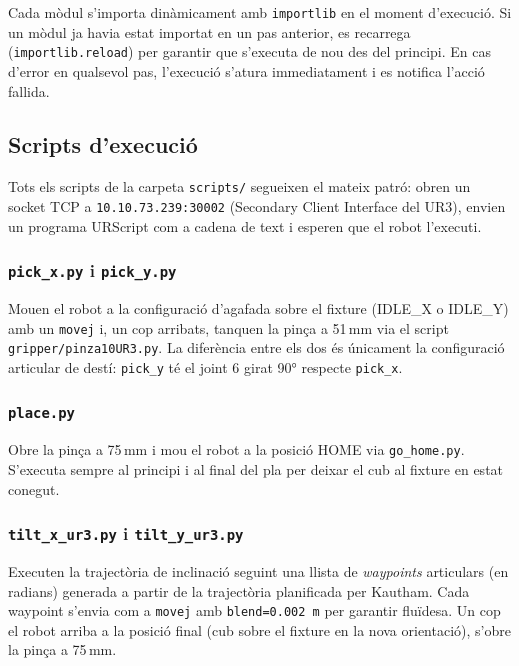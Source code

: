 \documentclass[12pt, a4paper]{article}
\begin{document}
Cada mòdul s'importa dinàmicament amb \texttt{importlib} en el moment d'execució. Si un mòdul ja havia estat importat en un pas anterior, es recarrega (\texttt{importlib.reload}) per garantir que s'executa de nou des del principi. En cas d'error en qualsevol pas, l'execució s'atura immediatament i es notifica l'acció fallida.

\subsection{Scripts d'execució}

Tots els scripts de la carpeta \texttt{scripts/} segueixen el mateix patró: obren un socket TCP a \texttt{10.10.73.239:30002} (Secondary Client Interface del UR3), envien un programa URScript com a cadena de text i esperen que el robot l'executi.

\subsubsection{\texttt{pick\_x.py} i \texttt{pick\_y.py}}

Mouen el robot a la configuració d'agafada sobre el fixture (IDLE\_X o IDLE\_Y) amb un \texttt{movej} i, un cop arribats, tanquen la pinça a 51\,mm via el script \texttt{gripper/pinza10UR3.py}. La diferència entre els dos és únicament la configuració articular de destí: \texttt{pick\_y} té el joint 6 girat 90° respecte \texttt{pick\_x}.

\subsubsection{\texttt{place.py}}

Obre la pinça a 75\,mm i mou el robot a la posició HOME via \texttt{go\_home.py}. S'executa sempre al principi i al final del pla per deixar el cub al fixture en estat conegut.

\subsubsection{\texttt{tilt\_x\_ur3.py} i \texttt{tilt\_y\_ur3.py}}

Executen la trajectòria de inclinació seguint una llista de \textit{waypoints} articulars (en radians) generada a partir de la trajectòria planificada per Kautham. Cada waypoint s'envia com a \texttt{movej} amb \texttt{blend=0.002\,m} per garantir fluïdesa. Un cop el robot arriba a la posició final (cub sobre el fixture en la nova orientació), s'obre la pinça a 75\,mm.
\end{document}
